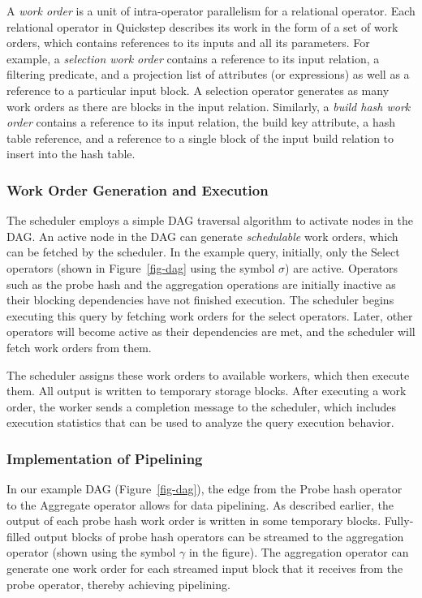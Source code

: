 A \textit{work order} is a unit of intra-operator parallelism for a relational operator. Each relational operator in Quickstep describes its work in the form of a set of work orders, which contains references to its inputs and all its parameters.
For example, a \textit{selection work order} contains a reference to its input relation, a filtering predicate, and a projection list of attributes (or expressions) as well as a reference to a particular input block. A selection operator generates as many work orders as there are blocks in the input relation. Similarly, a \textit{build hash work order} contains a reference to its input relation, the build key attribute, a hash table reference, and a reference to a single block of the input build relation to insert into the hash table.

\subsubsection{Work Order Generation and Execution}

The scheduler employs a simple DAG traversal algorithm to activate nodes in the DAG.
An active node in the DAG can generate \textit{schedulable} work orders, which can be fetched by the scheduler.
In the example query, initially, only the Select operators (shown in Figure~\ref{fig-dag} using the symbol $\sigma$) are active. Operators such as the probe hash and the aggregation operations are initially inactive as their blocking dependencies have not finished execution.
The scheduler begins executing this query by fetching work orders for the select operators. Later, other operators will become active as their dependencies are met, and the  scheduler will fetch work orders from them.

The scheduler assigns these work orders to available workers, which then execute them. All output is written to temporary storage blocks. After executing a work order, the worker sends a completion message to the scheduler, which includes execution statistics that can be used %
to analyze the query execution behavior.

\subsubsection{Implementation of Pipelining}
In our example DAG (Figure~\ref{fig-dag}), the edge from the Probe hash operator to the Aggregate operator allows for data pipelining.
As described earlier, the output of each probe hash work order is written in some temporary blocks.
Fully-filled output blocks of probe hash operators can be streamed to the aggregation operator (shown using the symbol $\gamma$ in the figure).
The aggregation operator can generate one work order for each streamed input block that it receives from the probe operator, thereby achieving pipelining.

